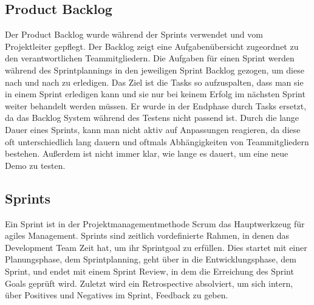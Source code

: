 \subsection{Product Backlog}\label{subsec:product-backlog}
%

Der Product Backlog wurde während der Sprints verwendet und vom Projektleiter gepflegt. Der Backlog zeigt eine Aufgabenübersicht zugeordnet zu den verantwortlichen Teammitgliedern.
Die Aufgaben für einen Sprint werden während des Sprintplannings in den jeweiligen Sprint Backlog gezogen, um diese nach und nach zu erledigen.
Das Ziel ist die Tasks so aufzuspalten, dass man sie in einem Sprint erledigen kann und sie nur bei keinem Erfolg im nächsten Sprint weiter behandelt werden müssen.
Er wurde in der Endphase durch Tasks ersetzt, da das Backlog System während des Testens nicht passend ist. Durch die lange Dauer eines Sprints, kann man nicht aktiv auf Anpassungen reagieren,
da diese oft unterschiedlich lang dauern und oftmals Abhängigkeiten von Teammitgliedern bestehen. Außerdem ist nicht immer klar, wie lange es dauert, um eine neue Demo zu testen.
%

\subsection{Sprints}\label{subsec:sprints}
%
Ein Sprint ist in der Projektmanagementmethode Scrum das Hauptwerkzeug für agiles Management. Sprints sind zeitlich vordefinierte Rahmen, in denen das Development Team Zeit hat, um ihr Sprintgoal zu erfüllen.
Dies startet mit einer Planungsphase, dem Sprintplanning, geht über in die Entwicklungsphase, dem Sprint, und endet mit einem Sprint Review, in dem die Erreichung des Sprint Goals geprüft wird.
Zuletzt wird ein Retrospective absolviert, um sich intern, über Positives und Negatives im Sprint, Feedback zu geben.
%

\renewcommand{\kapitelautor}{}
